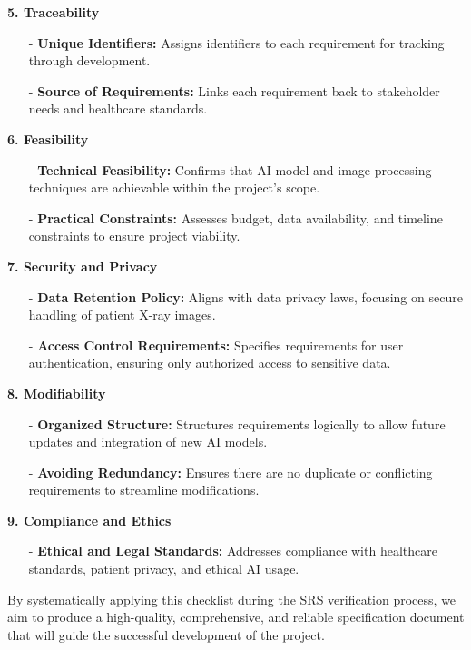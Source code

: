 \documentclass[12pt, titlepage]{article}
\begin{document}
\textbf{5. Traceability} 
\begin{itemize}
    \item[-] \textbf{Unique Identifiers:} Assigns identifiers to each requirement for tracking through development. 
    \item[-] \textbf{Source of Requirements:} Links each requirement back to stakeholder needs and healthcare standards. 
\end{itemize}
\textbf{6. Feasibility} 
\begin{itemize}
    \item[-] \textbf{Technical Feasibility:} Confirms that AI model and image processing techniques are achievable within the project's scope. 
    \item[-] \textbf{Practical Constraints:} Assesses budget, data availability, and timeline constraints to ensure project viability. 
\end{itemize}

\noindent \textbf{7. Security and Privacy} 
\begin{itemize}
    \item[-] \textbf{Data Retention Policy:} Aligns with data privacy laws, focusing on secure handling of patient X-ray images. 
    \item[-] \textbf{Access Control Requirements:} Specifies requirements for user authentication, ensuring only authorized access to sensitive data. 
\end{itemize}
\textbf{8. Modifiability} 
\begin{itemize}
    \item[-] \textbf{Organized Structure:} Structures requirements logically to allow future updates and integration of new AI models. 
    \item[-] \textbf{Avoiding Redundancy:} Ensures there are no duplicate or conflicting requirements to streamline modifications. 
\end{itemize}
\textbf{9. Compliance and Ethics} 
\begin{itemize}
    \item[-] \textbf{Ethical and Legal Standards:} Addresses compliance with healthcare standards, patient privacy, and ethical AI usage. 
\end{itemize}

By systematically applying this checklist during the SRS verification process, we aim to produce a high-quality, comprehensive, and reliable specification document that will guide the successful development of the project.
\end{document}
